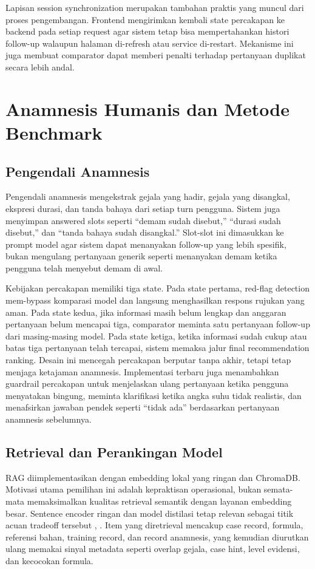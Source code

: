 \documentclass[conference]{IEEEtran}
\begin{document}
Lapisan session synchronization merupakan tambahan praktis yang muncul dari proses pengembangan. Frontend mengirimkan kembali state percakapan ke backend pada setiap request agar sistem tetap bisa mempertahankan histori follow-up walaupun halaman di-refresh atau service di-restart. Mekanisme ini juga membuat comparator dapat memberi penalti terhadap pertanyaan duplikat secara lebih andal.

\section{Anamnesis Humanis dan Metode Benchmark}
\subsection{Pengendali Anamnesis}
Pengendali anamnesis mengekstrak gejala yang hadir, gejala yang disangkal, ekspresi durasi, dan tanda bahaya dari setiap turn pengguna. Sistem juga menyimpan answered slots seperti ``demam sudah disebut,'' ``durasi sudah disebut,'' dan ``tanda bahaya sudah disangkal.'' Slot-slot ini dimasukkan ke prompt model agar sistem dapat menanyakan follow-up yang lebih spesifik, bukan mengulang pertanyaan generik seperti menanyakan demam ketika pengguna telah menyebut demam di awal.

Kebijakan percakapan memiliki tiga state. Pada state pertama, red-flag detection mem-bypass komparasi model dan langsung menghasilkan respons rujukan yang aman. Pada state kedua, jika informasi masih belum lengkap dan anggaran pertanyaan belum mencapai tiga, comparator meminta satu pertanyaan follow-up dari masing-masing model. Pada state ketiga, ketika informasi sudah cukup atau batas tiga pertanyaan telah tercapai, sistem memaksa jalur final recommendation ranking. Desain ini mencegah percakapan berputar tanpa akhir, tetapi tetap menjaga ketajaman anamnesis. Implementasi terbaru juga menambahkan guardrail percakapan untuk menjelaskan ulang pertanyaan ketika pengguna menyatakan bingung, meminta klarifikasi ketika angka suhu tidak realistis, dan menafsirkan jawaban pendek seperti ``tidak ada'' berdasarkan pertanyaan anamnesis sebelumnya.

\subsection{Retrieval dan Perankingan Model}
RAG diimplementasikan dengan embedding lokal yang ringan dan ChromaDB. Motivasi utama pemilihan ini adalah kepraktisan operasional, bukan semata-mata memaksimalkan kualitas retrieval semantik dengan layanan embedding besar. Sentence encoder ringan dan model distilasi tetap relevan sebagai titik acuan tradeoff tersebut \cite{b7}, \cite{b8}. Item yang diretrieval mencakup case record, formula, referensi bahan, training record, dan record anamnesis, yang kemudian diurutkan ulang memakai sinyal metadata seperti overlap gejala, case hint, level evidensi, dan kecocokan formula.
\end{document}
